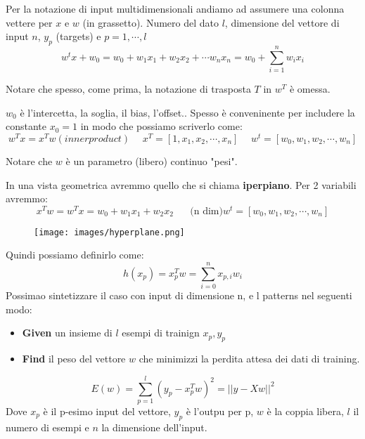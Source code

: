 Per la notazione di input multidimensionali andiamo ad assumere una colonna vettere per $x$ e $w$ (in grassetto). Numero 
del dato $l$, dimensione del vettore di input $n$, $y_p$ (targets) e $p = 1, \cdots, l$
$$w^t x + w_0 = w_0 + w_1 x_1 + w_2 x_2 + \cdots w_n x_n = w_0 + \sum_{i=1}^{n} w_i x_i$$
\begin{note}
    Notare che spesso, come prima, la notazione di trasposta $T$ in $w^T$ è omessa.
\end{note}
\hspace{-15pt}$w_0$ è l'intercetta, la soglia, il bias, l'offset.. Spesso è conveninente per includere la constante $x_0 = 1$ 
in modo che possiamo scriverlo come:
$$w^T x = x^T w (inner product) \hspace{15pt}x^T = [1, x_1, x_2, \cdots, x_n] \hspace{15pt} w^t = [w_0, w_1, w_2, \cdots, w_n]$$
\begin{note}
    Notare che $w$ è un parametro (libero) continuo "pesi".
\end{note}

\hspace{-15pt}In una vista geometrica avremmo quello che si chiama \textbf{iperpiano}. Per 2 variabili avremmo:
$$x^T w = w^T x = w_0 + w_1 x_1 + w_2 x_2 \hspace{20pt} \text{(n dim)} w^t = [w_0, w_1, w_2, \cdots, w_n]$$
\begin{figure}[h!]
    \centering
    \texttt{[image: images/hyperplane.png]}
\end{figure}
Quindi possiamo definirlo come:
$$h(x_p) = x_p^T w = \sum_{i=0}^{n}x_{p,i} w_i$$
Possimao sintetizzare il caso con input di dimensione n, e l patterns nel seguenti modo:
\begin{itemize}
    \item \textbf{Given} un insieme di $l$ esempi di trainign $x_p, y_p$
    \item \textbf{Find} il peso del vettore $w$ che minimizzi la perdita attesa dei dati di training.
\end{itemize}
$$E(w) = \sum_{p=1}^{l}(y_p - x_p^T w)^2 = ||y - Xw||^2$$
Dove $x_p$ è il p-esimo input del vettore, $y_p$ è l'outpu per p, $w$ è la coppia libera, $l$ il numero
di esempi e $n$ la dimensione dell'input.

